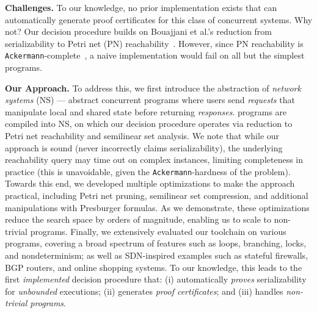 \smallskip
\noindent
\textbf{Challenges.}
To our knowledge, no prior implementation exists that can automatically generate proof certificates for this class of concurrent systems.
Why not?
Our decision procedure builds on Bouajjani et al.'s reduction from serializability to Petri net (PN) reachability~\cite{BoEmEnHa13}. However, since PN reachability is \texttt{Ackermann}-complete~\cite{CzWo22}, a naive implementation would fail on all but the simplest programs. 

\smallskip
\noindent
\textbf{Our Approach.}
To address this, we first introduce the abstraction of \textit{network systems} (NS) --- abstract concurrent programs where users send \textit{requests} that manipulate local and shared state before returning \textit{responses}. \toolname{} programs are compiled into NS, on which our decision procedure operates via reduction to Petri net reachability and semilinear set analysis.
%
We note that while our approach is sound (never incorrectly claims serializability), the underlying reachability query may time out on complex instances, limiting completeness in practice (this is unavoidable, given the \texttt{Ackermann}-hardness of the problem).
%
Towards this end, we developed multiple optimizations to make the approach practical, including Petri net pruning, semilinear set compression, and additional manipulations with Presburger formulas.
As we demonstrate, these optimizations reduce the search space by orders of magnitude, enabling us to scale to non-trivial programs.
%
Finally, 
we extensively evaluated our \toolname{} toolchain on various programs, covering a broad spectrum of features such as loops, branching, locks, and nondeterminism; as well as SDN-inspired examples such as stateful firewalls, BGP routers, and online shopping systems.
%
To our knowledge, this leads to the first \emph{implemented} decision procedure that: (i) automatically \textit{proves} serializability for \textit{unbounded} executions; (ii) generates \textit{proof certificates}; and (iii) handles \textit{non-trivial programs}.


